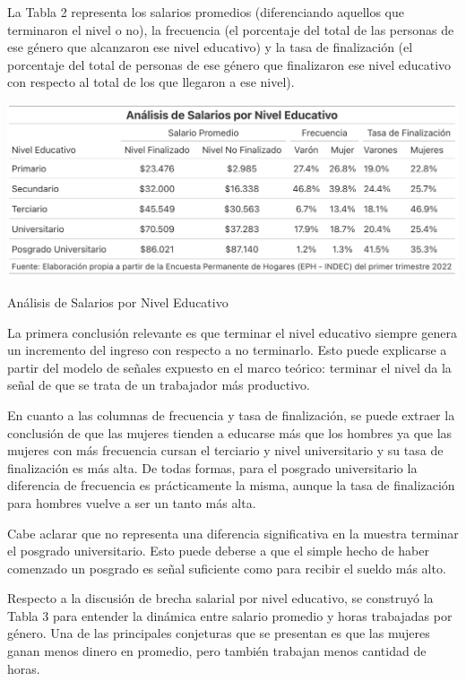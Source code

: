 \documentclass[a4paper]{article}
\theoremstyle{plain}
\theoremstyle{definition}
\begin{document}
La Tabla 2 representa los salarios promedios (diferenciando aquellos que terminaron el nivel o no), la frecuencia (el porcentaje del total de las personas de ese género que alcanzaron ese nivel educativo) y la tasa de finalización (el porcentaje del total de personas de ese género que finalizaron ese nivel educativo con respecto al total de los que llegaron a ese nivel). 
\begin{table}[h]
\label{tab:my table} 
\centering
\includegraphics[scale=0.55]{figuras/tasa_finalizacion.png}
\caption{Análisis de Salarios por Nivel Educativo} 
\end{table}

La primera conclusión relevante es que terminar el nivel educativo siempre genera un incremento del ingreso con respecto a no terminarlo. Esto puede explicarse a partir del modelo de señales expuesto en el marco teórico: terminar el nivel da la señal de que se trata de un trabajador más productivo. 

En cuanto a las columnas de frecuencia y tasa de finalización, se puede extraer la conclusión de que las mujeres tienden a educarse más que los hombres ya que las mujeres con más frecuencia cursan el terciario y nivel universitario y su tasa de finalización es más alta. De todas formas, para el posgrado universitario la diferencia de frecuencia es prácticamente la misma, aunque la tasa de finalización para hombres vuelve a ser un tanto más alta. 


Cabe aclarar que no representa una diferencia significativa en la muestra terminar el posgrado universitario. Esto puede deberse a que el simple hecho de haber comenzado un posgrado es señal suficiente como para recibir el sueldo más alto. 

Respecto a la discusión de brecha salarial por nivel educativo, se construyó la Tabla 3 para entender la dinámica entre salario promedio y horas trabajadas por género. Una de las principales conjeturas que se presentan es que las mujeres ganan menos dinero en promedio, pero también trabajan menos cantidad de horas. 
\end{document}
